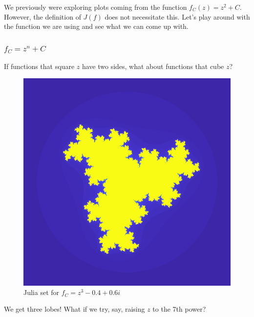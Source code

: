 \documentclass[12pt]{article}
\begin{document}
We previously were exploring plots coming from the function $f_C(z) = z^2 + C$. However, the definition of $J(f)$ does not necessitate this. Let's play around with the function we are using and see what we can come up with.

\subsubsection{$f_C = z^n + C$}

If functions that square $z$ have two sides, what about functions that cube $z$?

\begin{figure}[H]
	\centering
	\includegraphics[scale=0.5]{cube.png}
	\caption{Julia set for $f_C = z^3 - 0.4 + 0.6i$}
\end{figure}

We get three lobes! What if we try, say, raising $z$ to the 7th power?
\end{document}
